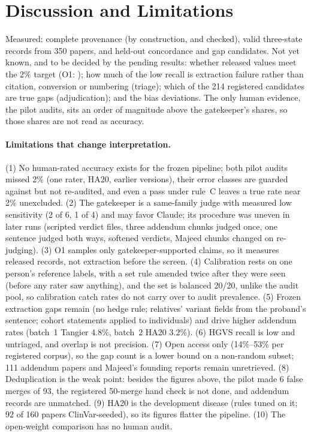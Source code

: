 \documentclass{article} %
\begin{document}
\section{Discussion and Limitations}
\label{sec:discussion}
Measured: complete provenance (by construction, and checked), valid three-state records from 350 papers, and held-out concordance and gap candidates. Not yet known, and to be decided by the pending results: whether released values meet the 2\% target (O1: ); how much of the low recall is extraction failure rather than citation, conversion or numbering (triage); which of the 214 registered candidates are true gaps (adjudication); and the bias deviations. The only human evidence, the pilot audits, sits an order of magnitude above the gatekeeper's shares, so those shares are not read as accuracy.

\paragraph{Limitations that change interpretation.} (1) No human-rated accuracy exists for the frozen pipeline; both pilot audits missed 2\% (one rater, HA20, earlier versions), their error classes are guarded against but not re-audited, and even a pass under rule~C leaves a true rate near 2\% unexcluded. (2) The gatekeeper is a same-family judge with measured low sensitivity (2 of 6, 1 of 4) and may favor Claude; its procedure was uneven in later runs (scripted verdict files, three addendum chunks judged once, one sentence judged both ways, softened verdicts, Majeed chunks changed on re-judging). (3) O1 samples only gatekeeper-supported claims, so it measures released records, not extraction before the screen. (4) Calibration rests on one person's reference labels, with a set rule amended twice after they were seen (before any rater saw anything), and the set is balanced 20/20, unlike the audit pool, so calibration catch rates do not carry over to audit prevalence. (5) Frozen extraction gaps remain (no hedge rule; relatives' variant fields from the proband's sentence; cohort statements applied to individuals) and drive higher addendum rates (batch~1 Tangier 4.8\%, batch~2 HA20 3.2\%). (6) HGVS recall is low and untriaged, and overlap is not precision. (7) Open access only (14\%--53\% per registered corpus), so the gap count is a lower bound on a non-random subset; 111 addendum papers and Majeed's founding reports remain unretrieved. (8) Deduplication is the weak point: besides the figures above, the pilot made 6 false merges of 93, the registered 50-merge hand check is not done, and addendum records are unmatched. (9) HA20 is the development disease (rules tuned on it; 92 of 160 papers ClinVar-seeded), so its figures flatter the pipeline. (10) The open-weight comparison has no human audit.
\end{document}
